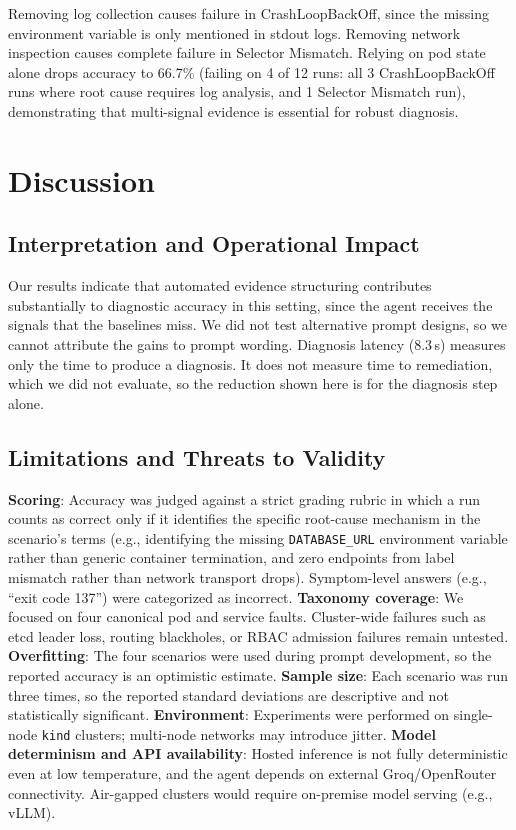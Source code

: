 \documentclass[12pt,onecolumn,draftclsnofoot]{IEEEtran}
\begin{document}
Removing log collection causes failure in CrashLoopBackOff, since the missing environment variable is only mentioned in stdout logs. Removing network inspection causes complete failure in Selector Mismatch. Relying on pod state alone drops accuracy to 66.7\% (failing on 4 of 12 runs: all 3 CrashLoopBackOff runs where root cause requires log analysis, and 1 Selector Mismatch run), demonstrating that multi-signal evidence is essential for robust diagnosis.

\section{Discussion}

\subsection{Interpretation and Operational Impact}
Our results indicate that automated evidence structuring contributes substantially to diagnostic accuracy in this setting, since the agent receives the signals that the baselines miss. We did not test alternative prompt designs, so we cannot attribute the gains to prompt wording. Diagnosis latency (8.3\,s) measures only the time to produce a diagnosis. It does not measure time to remediation, which we did not evaluate, so the reduction shown here is for the diagnosis step alone.

\subsection{Limitations and Threats to Validity}
\textbf{Scoring}: Accuracy was judged against a strict grading rubric in which a run counts as correct only if it identifies the specific root-cause mechanism in the scenario's terms (e.g., identifying the missing \texttt{DATABASE\_URL} environment variable rather than generic container termination, and zero endpoints from label mismatch rather than network transport drops). Symptom-level answers (e.g., ``exit code 137'') were categorized as incorrect.
\textbf{Taxonomy coverage}: We focused on four canonical pod and service faults. Cluster-wide failures such as etcd leader loss, routing blackholes, or RBAC admission failures remain untested. \textbf{Overfitting}: The four scenarios were used during prompt development, so the reported accuracy is an optimistic estimate. \textbf{Sample size}: Each scenario was run three times, so the reported standard deviations are descriptive and not statistically significant. \textbf{Environment}: Experiments were performed on single-node \texttt{kind} clusters; multi-node networks may introduce jitter. \textbf{Model determinism and API availability}: Hosted inference is not fully deterministic even at low temperature, and the agent depends on external Groq/OpenRouter connectivity. Air-gapped clusters would require on-premise model serving (e.g., vLLM).
\end{document}
